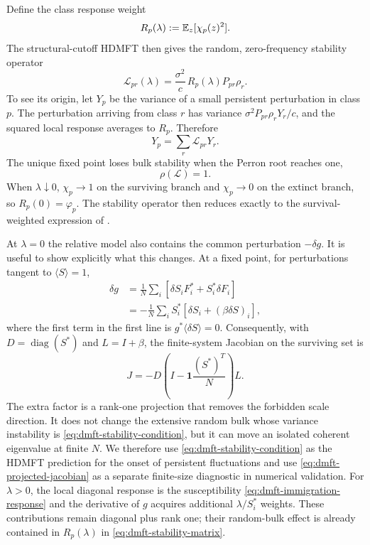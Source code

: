 Define the class response weight
\begin{equation}
    R_p(\lambda):=\mathbb{E}_z[\chi_p(z)^2].
    \label{eq:dmft-response-weight}
\end{equation}
The structural-cutoff HDMFT then gives the random, zero-frequency stability operator
\begin{equation}
    \mathcal L_{pr}(\lambda)
       =\frac{\sigma^2}{c}\,R_p(\lambda)P_{pr}\rho_r.
    \label{eq:dmft-stability-matrix}
\end{equation}
To see its origin, let $Y_p$ be the variance of a small persistent perturbation in class $p$.
The perturbation arriving from class $r$ has variance
$\sigma^2P_{pr}\rho_rY_r/c$, and the squared local response averages to $R_p$.  Therefore
\begin{equation}
    Y_p=\sum_r\mathcal L_{pr}Y_r.
    \label{eq:dmft-stability-eigenproblem}
\end{equation}
The unique fixed point loses bulk stability when the Perron root reaches one,
\begin{equation}
    \rho(\mathcal L)=1.
    \label{eq:dmft-stability-condition}
\end{equation}
When $\lambda\downarrow0$, $\chi_p\to1$ on the surviving branch and $\chi_p\to0$ on the
extinct branch, so $R_p(0)=\varphi_p$.  The stability operator then reduces exactly to the
survival-weighted expression of \citet{patil2026}.

At $\lambda=0$ the relative model also contains the common perturbation $-\delta g$.  It is
useful to show explicitly what this changes.  At a fixed point, for perturbations tangent to
$\langle S\rangle=1$,
\begin{align}
    \delta g
      &=\frac1N\sum_i\left[\delta S_iF_i^*
          +S_i^*\delta F_i\right]\nonumber\\
      &=-\frac1N\sum_iS_i^*\left[\delta S_i+(\beta\delta S)_i\right],
    \label{eq:dmft-delta-g}
\end{align}
where the first term in the first line is $g^*\langle\delta S\rangle=0$.  Consequently,
with $D=\operatorname{diag}(S^*)$ and $L=I+\beta$, the finite-system Jacobian on the surviving
set is
\begin{equation}
    J=-D\left(I-\mathbf 1\frac{(S^*)^{\!T}}{N}\right)L.
    \label{eq:dmft-projected-jacobian}
\end{equation}
The extra factor is a rank-one projection that removes the forbidden scale direction.  It does
not change the extensive random bulk whose variance instability is
\eqref{eq:dmft-stability-condition}, but it can move an isolated coherent eigenvalue at finite
$N$.  We therefore use \eqref{eq:dmft-stability-condition} as the HDMFT prediction for the
onset of persistent fluctuations and use \eqref{eq:dmft-projected-jacobian} as a separate
finite-size diagnostic in numerical validation.
For $\lambda>0$, the local diagonal response is the susceptibility
\eqref{eq:dmft-immigration-response} and the derivative of $g$ acquires additional
$\lambda/S_i^*$ weights.  These contributions remain diagonal plus rank one; their random-bulk
effect is already contained in $R_p(\lambda)$ in \eqref{eq:dmft-stability-matrix}.

